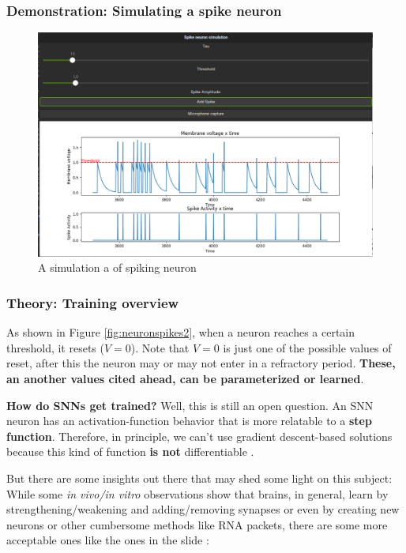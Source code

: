 \begin{frame}[allowframebreaks]
	\frametitle{Demonstration: Simulating a spike neuron}
	\begin{figure}
		\centering
		\includegraphics[width=0.6\linewidth]{images/spikeNeuronSimulation}
		\caption[Spiking Neuron Simulator]{A simulation a of spiking neuron}
		\label{fig:spikeneuronsimulation}
	\end{figure}
\end{frame}

\begin{frame}
	\frametitle{Theory: Training overview}
	\par As shown in Figure \ref{fig:neuronspikes2}, when a neuron reaches a certain threshold, it resets ($V = 0$). Note that $V=0$ is just one of the possible values of reset, after this the neuron may or may not enter in a refractory period. \textbf{These, an another values cited ahead, can be parameterized or learned}.\newline
	
	\par \textbf{How do SNNs get trained?} Well, this is still an open question. An SNN neuron has an activation-function behavior that is more relatable to a \textbf{step function}. Therefore, in principle, we can't use gradient descent-based solutions because this kind of function \textbf{is not} differentiable \cite{kasabov2019time}.\newline
	
	\par But there are some insights out there that may shed some light on this subject: While some \textit{in vivo/in vitro} observations show that brains, in general, learn by strengthening/weakening and adding/removing synapses or even by creating new neurons or other cumbersome methods like RNA packets, there are some more acceptable ones like the ones in the slide \cite{kasabov2019time}:

\end{frame}

